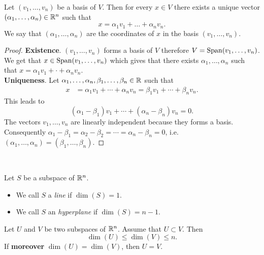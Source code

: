 \documentclass[11pt,nocut]{article}
\begin{document}
\begin{proposition}[Coordinates]
	Let $(v_1, \dots, v_n)$ be a basis of $V$. Then for every $x \in V$ there exists a unique vector $(\alpha_1, \dots, \alpha_n) \in \mathbb{R}^n$ such that
	$$
	x = \alpha_1 v_1 + \dots + \alpha_n v_n.
	$$
	We say that $(\alpha_1, \dots, \alpha_n)$ are the coordinates of $x$ in the basis $(v_1, \dots, v_n)$.
\end{proposition}
\begin{proof}
	\textbf{Existence}. $(v_1, \dots, v_n)$ forms a basis of $V$ therefore  $V = {{\rm Span}}(v_1, \dots, v_n)$. We get that $x \in {{\rm Span}}(v_1, \dots, v_n)$ which gives that there exists $\alpha_1, \dots, \alpha_n$ such that $x = \alpha_1 v_1 + \cdot + \alpha_n v_n$.
	\\
	\textbf{Uniqueness}. Let $\alpha_1, \dots, \alpha_n, \beta_1, \dots, \beta_n \in \mathbb{R}$ such that
	\begin{align*}
		x &= \alpha_1 v_1 + \cdots + \alpha_n v_n = \beta_1 v_1 + \cdots + \beta_n v_n.
	\end{align*}
	This leads to
	$$
	(\alpha_1 - \beta_1) v_1 + \cdots + (\alpha_n - \beta_n) v_n = 0.
	$$
	The vectors $v_1, \dots, v_n$ are linearly independent because they forms a basis. Consequently $\alpha_1 - \beta_1 = \alpha_2 - \beta_2 = \cdots =  \alpha_n - \beta_n = 0$, i.e.\ $(\alpha_1, \dots, \alpha_n) = (\beta_1, \dots, \beta_n)$.
\end{proof}
\\
\begin{definition}
	Let $S$ be a subspace of $\mathbb{R}^n$.
	\begin{itemize}
		\item We call $S$ a \emph{line} if $\dim(S) = 1$.
		\item We call $S$ an \emph{hyperplane} if $\dim(S) = n-1$.
	\end{itemize}
\end{definition}
\begin{proposition}
	Let	$U$ and $V$ be two subspaces of $\mathbb{R}^n$. Assume that $U \subset V$. Then
	$$
	\dim(U) \leq \dim(V) \leq n.
	$$
	If \textbf{moreover} $\dim(U) = \dim(V)$, then $U = V$.
\end{proposition}
\end{document}
